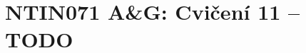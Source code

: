 \documentclass[a4paper,12pt]{amsart}
\begin{document}
\thispagestyle{empty}

\section*{NTIN071 A\&G: Cvičení 11 -- TODO}


\medskip
\end{document}
